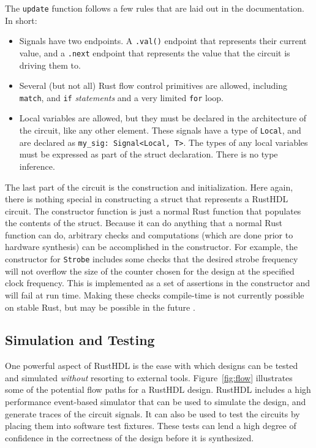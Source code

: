 \documentclass[conference]{IEEEtran}
\begin{document}
The \verb|update| function follows a few rules that are laid out in the documentation.  In short:
\begin{itemize}
  \item Signals have two endpoints.  A \verb|.val()| endpoint that represents their current value, and a \verb|.next| 
    endpoint that represents the value that the circuit is driving them to.
  \item Several (but not all) Rust flow control primitives are allowed, including \verb|match|, and  \verb|if| \emph{statements} 
  and a very limited \verb|for| loop.  
  \item Local variables are allowed, but they must be declared in the architecture of the circuit, like any other element.
  These signals have a type of \verb|Local|, and are declared as \verb|my_sig: Signal<Local, T>|.  The types of any local 
  variables must be expressed as part of the struct declaration.  There is no type inference.
\end{itemize}

The last part of the circuit is the construction and initialization.  Here again, there is nothing special in constructing 
a struct that represents a RustHDL circuit.  The 
constructor function is just a normal Rust function that populates the contents of the struct.  Because it can do anything
that a normal Rust function can do, arbitrary checks and computations (which are done prior to hardware synthesis) can be 
accomplished in the constructor.  For example, the constructor for \verb|Strobe| includes some checks that the 
desired strobe frequency will not overflow the size of the counter chosen for the design at the specified clock frequency.  
This is implemented as a set  of assertions in the constructor and will fail at run time.  Making these checks 
compile-time is not currently possible on stable Rust, but may be possible in the future \cite{b11}.

\subsection{Simulation and Testing}

One powerful aspect of RustHDL is the ease with which designs can be tested and simulated \emph{without} 
resorting to external tools.  Figure~\ref{fig:flow} illustrates some of the potential flow paths for a 
RustHDL design.  RustHDL includes a high
performance event-based simulator that can be used to simulate the design, and generate traces of the circuit
signals.  It can also be used to test the circuits by placing them into software test fixtures. 
These tests can lend a high degree of confidence in the correctness of the design before it is synthesized.
\end{document}

